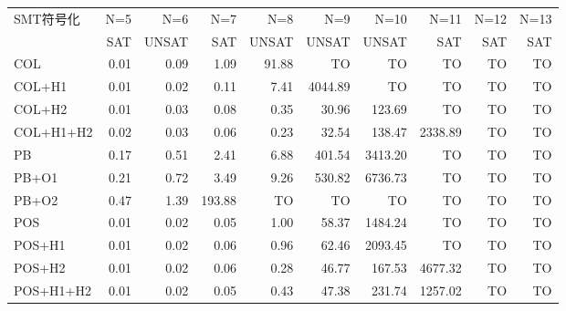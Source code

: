 
\begin{tabular}[c]{|l|r|r|r|r|r|r|r|r|r|}
    SMT符号化  & N=5  & N=6     & N=7          & N=8          &    N=9                &   N=10                   &    N=11& N=12& N=13 \\
               & SAT  & UNSAT   & SAT          & UNSAT        &  UNSAT        &  UNSAT         &    SAT & SAT & SAT \\\hline
    COL        & 0.01 & 0.09    & 1.09         & 91.88        & TO            &      TO        &      TO&   TO& TO \\
    COL+H1     & 0.01 & 0.02    & 0.11         & 7.41         & 4044.89       &      TO        &      TO&   TO& TO \\
    COL+H2     & 0.01 & 0.03    & 0.08         & 0.35         & \alert{30.96} &  \alert{123.69}&      TO&   TO& TO \\
    COL+H1+H2  & 0.02 & 0.03    & 0.06         & \alert{0.23} & 32.54         &  138.47        & 2338.89&   TO& TO \\\hline
    PB         & 0.17 & 0.51    & 2.41         & 6.88         & 401.54        & 3413.20        &      TO&   TO& TO \\
    PB+O1      & 0.21 & 0.72    & 3.49         & 9.26         & 530.82        & 6736.73        &      TO&   TO& TO \\
    PB+O2      & 0.47 & 1.39    & 193.88       & TO           & TO            & TO             &      TO&   TO& TO \\\hline
    POS        & 0.01 & 0.02    & \alert{0.05} & 1.00         & 58.37 & 1484.24&              TO&   TO& TO \\
    POS+H1     & 0.01 & 0.02    & 0.06                  & 0.96         & 62.46 & 2093.45&              TO&   TO& TO \\
    POS+H2     & 0.01 & 0.02    & 0.06         & 0.28         & 46.77 &  167.53&         4677.32&   TO& TO \\
    POS+H1+H2  & 0.01 & 0.02    & \alert{0.05} & 0.43         & 47.38 &  231.74& \alert{1257.02}&   TO& TO
\end{tabular}
